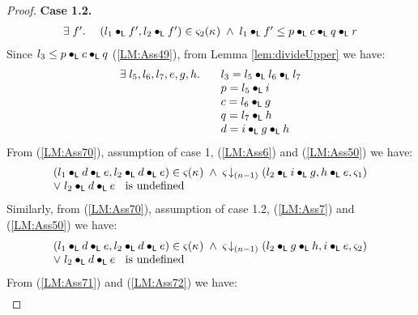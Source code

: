 \begin{lemma}[]
\begin{proof}
\noindent\textbf{Case 1.2.}
\[
\begin{array}{l l}
	\exists\; f'.\;& (l_1 \bullet_{\textsf{L}} f', l_2 \bullet_{\textsf{L}} f') \in \varsigma_{2}(\kappa_{}) \;\land\; l_1 \bullet_{\textsf{L}} f' \leq p \bullet_{\textsf{L}} c \bullet_{\textsf{L}} q \bullet_{\textsf{L}} r \\
\end{array}
\]
%
%
Since $l_3 \leq p \bullet_{\textsf{L}} c \bullet_{\textsf{L}} q$ (\ref{LM:Ass49}), from Lemma \ref{lem:divideUpper} we have:
%
\begin{align}
	\begin{array}{l l}
		\exists\; l_5, l_6, l_7, e, g, h.\; \hspace*{0.2cm} & l_3 = l_5 \bullet_{\textsf{L}} l_6 \bullet_{\textsf{L}} l_7\\
		& p = l_5 \bullet_{\textsf{L}} i\\
		& c = l_6 \bullet_{\textsf{L}} g\\
		& q = l_7 \bullet_{\textsf{L}} h\\
		& d = i \bullet_{\textsf{L}} g \bullet_{\textsf{L}} h
	\end{array} \label{LM:Ass70}
\end{align} 
%
From (\ref{LM:Ass70}), assumption of case 1, (\ref{LM:Ass6}) and (\ref{LM:Ass50}) we have:
%
%
\begin{align}
	\begin{array}{l}
		(l_1 \bullet_{\textsf{L}} d \bullet_{\textsf{L}} e, l_2 \bullet_{\textsf{L}} d \bullet_{\textsf{L}} e) \in \varsigma_{}(\kappa_{}) \;\land\;
		\varsigma_{} \!\downarrow_{(n-1)} \left(l_2 \bullet_{\textsf{L}} i \bullet_{\textsf{L}} g, h \bullet_{\textsf{L}} e, \varsigma_{1}\right)\\
		\lor\; l_2 \bullet_{\textsf{L}} d \bullet_{\textsf{L}} e \hspace*{0.2cm}\text{ is undefined}
	\end{array} \label{LM:Ass71}
\end{align}
Similarly, from (\ref{LM:Ass70}), assumption of case 1.2, (\ref{LM:Ass7}) and (\ref{LM:Ass50}) we have:
%
\begin{align}
	\begin{array}{l}
		(l_1 \bullet_{\textsf{L}} d \bullet_{\textsf{L}} e, l_2 \bullet_{\textsf{L}} d \bullet_{\textsf{L}} e) \in \varsigma_{}(\kappa_{}) \;\land\;
		\varsigma_{} \!\downarrow_{(n-1)} \left(l_2 \bullet_{\textsf{L}} g \bullet_{\textsf{L}} h, i \bullet_{\textsf{L}} e, \varsigma_{2}\right)\\
		\lor\; l_2 \bullet_{\textsf{L}} d \bullet_{\textsf{L}} e \hspace*{0.2cm}\text{ is undefined}
	\end{array} \label{LM:Ass72}
\end{align}
From (\ref{LM:Ass71}) and (\ref{LM:Ass72}) we have:
%
\begin{align}

\end{align}
\end{proof}
\end{lemma}
